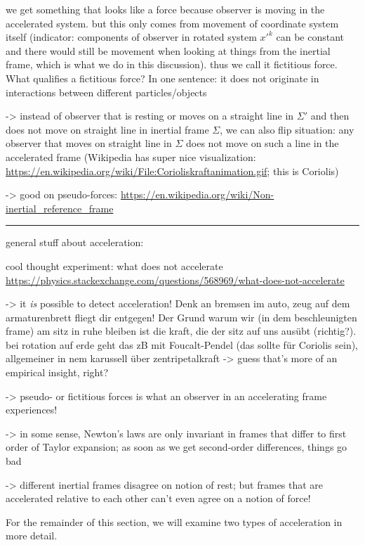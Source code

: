 \documentclass[../class_mech_main.tex]{subfiles}
\begin{document}
we get something that looks like a force because observer is moving in the accelerated system. but this only comes from movement of coordinate system itself (indicator: components of observer in rotated system $x'^k$ can be constant and there would still be movement when looking at things from the inertial frame, which is what we do in this discussion). thus we call it fictitious force. What qualifies a fictitious force? In one sentence: it does not originate in interactions between different particles/objects


-> instead of observer that is resting or moves on a straight line in $\Sigma'$ and then does not move on straight line in inertial frame $\Sigma$, we can also flip situation: any observer that moves on straight line in $\Sigma$ does not move on such a line in the accelerated frame (Wikipedia has super nice visualization: \url{https://en.wikipedia.org/wiki/File:Corioliskraftanimation.gif}; this is Coriolis)

-> good on pseudo-forces: \url{https://en.wikipedia.org/wiki/Non-inertial_reference_frame}


\hrule

general stuff about acceleration:

cool thought experiment: what does not accelerate \url{https://physics.stackexchange.com/questions/568969/what-does-not-accelerate}


-> it \emph{is} possible to detect acceleration! Denk an bremsen im auto, zeug auf dem armaturenbrett fliegt dir entgegen! Der Grund warum wir (in dem beschleunigten frame) am sitz in ruhe bleiben ist die kraft, die der sitz auf uns ausübt (richtig?). bei rotation auf erde geht das zB mit Foucalt-Pendel (das sollte für Coriolis sein), allgemeiner in nem karussell über zentripetalkraft -> guess that's more of an empirical insight, right?


-> pseudo- or fictitious forces is what an observer in an accelerating frame experiences!


-> in some sense, Newton's laws are only invariant in frames that differ to first order of Taylor expansion; as soon as we get second-order differences, things go bad

-> different inertial frames disagree on notion of rest; but frames that are accelerated relative to each other can't even agree on a notion of force!


For the remainder of this section, we will examine two types of acceleration in more detail.
\end{document}
